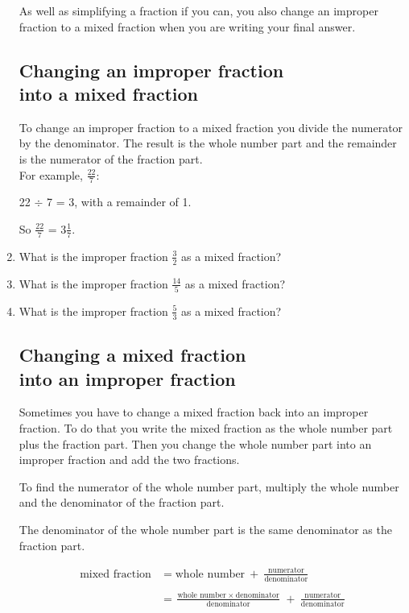 \documentclass[14pt]{article}
\begin{document}
\begin{enumerate}
As well as simplifying a fraction if you can, you also change an improper fraction to a mixed fraction when you are writing your final answer.

\newpage

\subsection*{Changing an improper fraction \\into a mixed fraction}
To change an improper fraction to a mixed fraction you divide the numerator by the denominator. The result is the whole number part and the remainder is the numerator of the fraction part.\\

For example, $\frac{22}{7}$:

22 $\div$ 7 = 3, with a remainder of 1.

So $\frac{22}{7}$ = $3 \frac{1}{7}$.\\

\item What is the improper fraction $\frac{3}{2}$ as a mixed fraction?
\item What is the improper fraction $\frac{14}{5}$ as a mixed fraction?
\item What is the improper fraction $\frac{5}{3}$ as a mixed fraction?

\newpage

\subsection*{Changing a mixed fraction \\ into an improper fraction}
Sometimes you have to change a mixed fraction back into an improper fraction. To do that you write the mixed fraction as the whole number part plus the fraction part. Then you change the whole number part into an improper fraction and add the two fractions.

To find the numerator of the whole number part, multiply the whole number and the denominator of the fraction part.

The denominator of the whole number part is the same denominator as the fraction part.

\begin{align*}
\textrm{mixed fraction} &= \textrm{whole number}\ +\ \frac{\textrm{numerator}}{\textrm{denominator}}\\\\
&= \frac{\textrm{whole number}\ \times\ \textrm{denominator}}{\textrm{denominator}}\
+\ \frac{\textrm{numerator}}{\textrm{denominator}}
\end{align*}


\end{enumerate}
\end{document}
